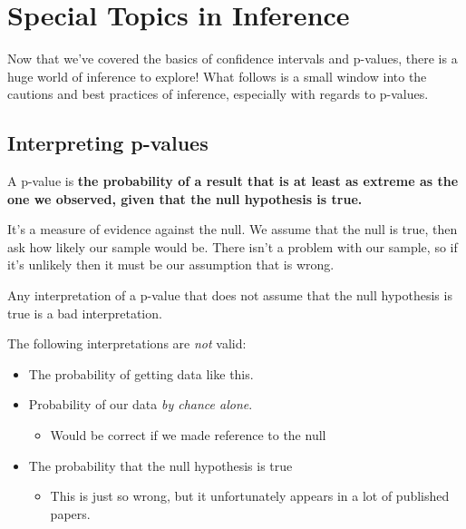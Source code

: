 \documentclass[
  letterpaper,
  DIV=11,
  numbers=noendperiod]{scrreprt}
\providecommand{\tightlist}{%
  \setlength{\itemsep}{0pt}\setlength{\parskip}{0pt}}\usepackage{longtable,booktabs,array}
\begin{document}
\hypertarget{special-topics-in-inference}{%
\chapter{Special Topics in
Inference}\label{special-topics-in-inference}}

Now that we've covered the basics of confidence intervals and p-values,
there is a huge world of inference to explore! What follows is a small
window into the cautions and best practices of inference, especially
with regards to p-values.

\hypertarget{interpreting-p-values}{%
\section{Interpreting p-values}\label{interpreting-p-values}}

A p-value is \textbf{the probability of a result that is at least as
extreme as the one we observed, given that the null hypothesis is true.}

It's a measure of evidence against the null. We assume that the null is
true, then ask how likely our sample would be. There isn't a problem
with our sample, so if it's unlikely then it must be our assumption that
is wrong.

\begin{tcolorbox}[enhanced jigsaw, toptitle=1mm, colbacktitle=quarto-callout-important-color!10!white, breakable, leftrule=.75mm, left=2mm, opacityback=0, colframe=quarto-callout-important-color-frame, rightrule=.15mm, toprule=.15mm, bottomtitle=1mm, titlerule=0mm, title=\textcolor{quarto-callout-important-color}{\faExclamation}\hspace{0.5em}{``Given that the null hypothesis is true''}, arc=.35mm, colback=white, bottomrule=.15mm, opacitybacktitle=0.6, coltitle=black]

Any interpretation of a p-value that does not assume that the null
hypothesis is true is a bad interpretation.

\end{tcolorbox}

The following interpretations are \emph{not} valid:

\begin{itemize}
\tightlist
\item
  The probability of getting data like this.
\item
  Probability of our data \emph{by chance alone}.

  \begin{itemize}
  \tightlist
  \item
    Would be correct if we made reference to the null
  \end{itemize}
\item
  The probability that the null hypothesis is true

  \begin{itemize}
  \tightlist
  \item
    This is just so wrong, but it unfortunately appears in a lot of
    published papers.
  \end{itemize}
\end{itemize}
\end{document}
